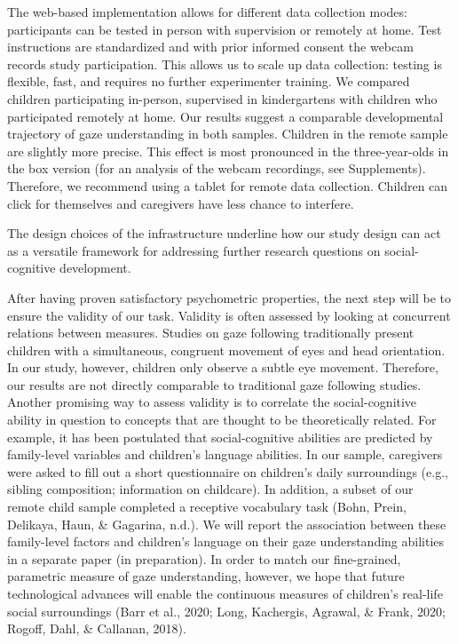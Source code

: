 \documentclass[
  man,floatsintext]{apa6}
\begin{document}
The web-based implementation allows for different data collection modes: participants can be tested in person with supervision or remotely at home.
Test instructions are standardized and with prior informed consent the webcam records study participation.
This allows us to scale up data collection: testing is flexible, fast, and requires no further experimenter training.
We compared children participating in-person, supervised in kindergartens with children who participated remotely at home.
Our results suggest a comparable developmental trajectory of gaze understanding in both samples.
Children in the remote sample are slightly more precise.
This effect is most pronounced in the three-year-olds in the box version (for an analysis of the webcam recordings, see Supplements).
Therefore, we recommend using a tablet for remote data collection.
Children can click for themselves and caregivers have less chance to interfere.

The design choices of the infrastructure underline how our study design can act as a versatile framework for addressing further research questions on social-cognitive development.

After having proven satisfactory psychometric properties, the next step will be to ensure the validity of our task.
Validity is often assessed by looking at concurrent relations between measures.
Studies on gaze following traditionally present children with a simultaneous, congruent movement of eyes and head orientation.
In our study, however, children only observe a subtle eye movement.
Therefore, our results are not directly comparable to traditional gaze following studies.
Another promising way to assess validity is to correlate the social-cognitive ability in question to concepts that are thought to be theoretically related.
For example, it has been postulated that social-cognitive abilities are predicted by family-level variables and children's language abilities.
In our sample, caregivers were asked to fill out a short questionnaire on children's daily surroundings (e.g., sibling composition; information on childcare).
In addition, a subset of our remote child sample completed a receptive vocabulary task (Bohn, Prein, Delikaya, Haun, \& Gagarina, n.d.). We will report the association between these family-level factors and children's language on their gaze understanding abilities in a separate paper (in preparation). In order to match our fine-grained, parametric measure of gaze understanding, however, we hope that future technological advances will enable the continuous measures of children's real-life social surroundings (Barr et al., 2020; Long, Kachergis, Agrawal, \& Frank, 2020; Rogoff, Dahl, \& Callanan, 2018).
\end{document}
